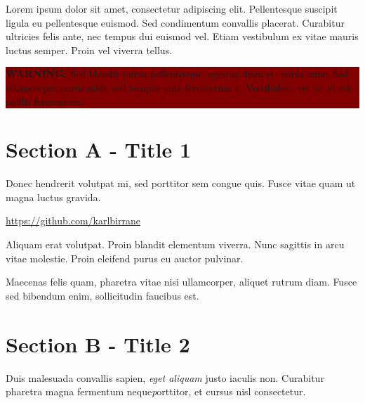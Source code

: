 \documentclass[10.5pt,a4paper]{article} %
\begin{document}
\begin{multicols*}{2} %

Lorem ipsum dolor sit amet, consectetur adipiscing elit. Pellentesque suscipit ligula eu pellentesque euismod. Sed condimentum convallis placerat. Curabitur ultricies felis ante, nec tempus dui euismod vel. Etiam vestibulum ex vitae mauris luctus semper. Proin vel viverra tellus.

\begin{center}
	\vspace{0.25cm} %
	\colorbox{Maroon}{ %
			\begin{minipage}{8cm}
			\color{white} %
			\vspace{0.1cm} %
			\textbf{WARNING:} Sed blandit purus pellentesque, egestas diam et, porta nunc. Sed ullamcorper purus nibh, sed tempor ante fermentum a. Vestibulum vel mi id est mollis fermentum. %
			\vspace{0.1cm} %
		\end{minipage}
	}
\end{center}


\section*{Section A - Title 1}
Donec hendrerit volutpat mi, sed porttitor sem congue quis. Fusce vitae quam ut magna luctus gravida.

\begin{center}
	\url{https://github.com/karlbirrane} %
\end{center}

Aliquam erat volutpat. Proin blandit elementum viverra. Nunc sagittis in arcu vitae molestie. Proin eleifend purus eu auctor pulvinar. 

Maecenas felis quam, pharetra vitae nisi ullamcorper, aliquet rutrum diam. Fusce sed bibendum enim, sollicitudin faucibus est.



\section*{Section B - Title 2}

Duis malesuada convallis sapien, \textit{eget aliquam} justo iaculis non. Curabitur pharetra magna {fermentum neque}\textit porttitor, et cursus nisl consectetur. %


\end{multicols*}
\end{document}
